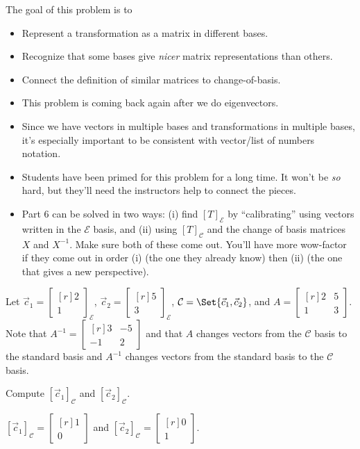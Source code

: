 \documentclass{problemset}
\newcommand{\mat}[1]{\begin{bmatrix*}[r]#1\end{bmatrix*}}
\begin{document}
	\question
	\begin{annotation}
		\begin{goals}

			The goal of this problem is to
			\begin{itemize}
				\item Represent a transformation as a matrix in different bases.
				\item Recognize that some bases give \emph{nicer} matrix representations
					than others.
				\item Connect the definition of similar matrices to change-of-basis.
			\end{itemize}
		\end{goals}

		\begin{notes}
			\begin{itemize}
				\item This problem is coming back again after we do eigenvectors.
				\item Since we have vectors in multiple bases and transformations in
					multiple bases, it's especially important to be consistent
					with vector/list of numbers notation.
				\item Students have been primed for this problem for a long time. It won't
					be \emph{so} hard, but they'll need the instructors help to connect the
					pieces.
				\item Part 6 can be solved in two ways: (i) find $[T]_{\mathcal E}$ by ``calibrating''
					using vectors written in the $\mathcal E$ basis, and (ii) using $[T]_{\mathcal C}$
					and the change of basis matrices $X$ and $X^{-1}$. Make sure both of these come out.
					You'll have more wow-factor if they come out in order (i) (the one
					they already know) then (ii) (the one that gives a new perspective).
			\end{itemize}
		\end{notes}
	\end{annotation}
	Let $\vec c_1=\mat{2\\1}_{\mathcal E}$, $\vec c_2=\mat{5\\3}_{\mathcal E}$, $\mathcal C=\Set{\vec c_1,\vec c_2}$, and $A=\mat{2&5\\1&3}$.
	Note that $A^{-1}=\mat{3&-5\\-1&2}$ and that $A$ changes vectors from the $\mathcal C$ basis to the standard
	basis and $A^{-1}$ changes vectors from the standard basis to the $\mathcal C$ basis.
	\begin{parts}
		\item Compute $[\vec c_1]_{\mathcal C}$ and $[\vec c_2]_{\mathcal C}$.
			\begin{solution}[inline]
				$[\vec c_1]_{\mathcal C}=\mat{1\\0}$ and
				$[\vec c_2]_{\mathcal C}=\mat{0\\1}$.
			\end{solution}
	\end{parts}
\end{document}
